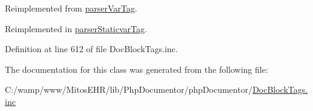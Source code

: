 \-Reimplemented from \hyperlink{classparser_var_tag_a4a925d6b38bcf3957c713a7d3dc7da1f}{parser\-Var\-Tag}.



\-Reimplemented in \hyperlink{classparser_staticvar_tag_a4a925d6b38bcf3957c713a7d3dc7da1f}{parser\-Staticvar\-Tag}.



\-Definition at line 612 of file \-Doc\-Block\-Tags.\-inc.



\-The documentation for this class was generated from the following file\-:\begin{DoxyCompactItemize}
\item 
\-C\-:/wamp/www/\-Mitos\-E\-H\-R/lib/\-Php\-Documentor/php\-Documentor/\hyperlink{_doc_block_tags_8inc}{\-Doc\-Block\-Tags.\-inc}\end{DoxyCompactItemize}
